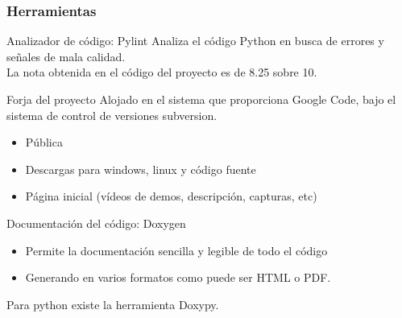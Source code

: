 \begin{frame}
    \frametitle{Herramientas}

        \begin{block}{Analizador de código: Pylint}
        Analiza el código Python en busca de errores y señales de mala calidad.\\
        La nota obtenida en el código del proyecto es de 8.25 sobre 10.
        \end{block}

        \begin{block}{Forja del proyecto}
        Alojado en el sistema que proporciona Google Code, bajo el sistema de control de versiones subversion.
            \begin{itemize}
                \item Pública
                \item Descargas para windows, linux y código fuente
                \item Página inicial (vídeos de demos, descripción, capturas, etc)
            \end{itemize}
        \end{block}

        \begin{block}{Documentación del código: Doxygen}
            \begin{itemize}
                \item Permite la documentación sencilla y legible de todo el código
                \item Generando en varios formatos como puede ser HTML o PDF.
            \end{itemize}
        Para python existe la herramienta Doxypy.
        \end{block}

\end{frame}

